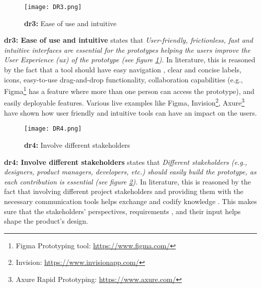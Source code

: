 \begin{figure}[htbp!]
  \centering    
  \texttt{[image: DR3.png]}
  \caption[Ease of use and intuitive]{\textbf{\ac{dr}3:} Ease of use and intuitive}
  \label{fig:design:dr3}
\end{figure}
\textbf{\ac{dr}3: Ease of use and intuitive} states that \textit{User-friendly, frictionless, fast and intuitive interfaces are essential for the prototypes helping the users improve the User Experience (\ac{ux}) of the prototype (see figure \ref{fig:design:dr3}).} 
In literature, this is reasoned by the fact that a tool should have easy navigation \cite{article:prototyping:hoffnagle}, clear and concise labels, icons, easy-to-use drag-and-drop functionality, collaboration capabilities (e.g., Figma\footnote{Figma Prototyping tool: \url{https://www.figma.com/}} has a feature where more than one person can access the prototype), and easily deployable \cite{article:prototyping:lowcode} features.
Various live examples like Figma, Invision\footnote{Invision: \url{https://www.invisionapp.com/}}, Axure\footnote{Axure Rapid Prototyping: \url{https://www.axure.com/}} have shown how user friendly and intuitive tools can have an impact on the users.

\begin{figure}[htbp!]
  \centering    
  \texttt{[image: DR4.png]}
  \caption[Involve different stakeholders]{\textbf{\ac{dr}4:} Involve different stakeholders}
  \label{fig:design:dr4}
\end{figure}
\textbf{\ac{dr}4: Involve different stakeholders} states that \textit{Different stakeholders (e.g., designers, product managers, developers, etc.) should easily build the prototype, as each contribution is essential (see figure \ref{fig:design:dr4}).}
In literature, this is reasoned by the fact that involving different project stakeholders and providing them with the necessary communication tools helps exchange and codify knowledge \cite{article:prototyping:weichbroth}. 
This makes sure that the stakeholders' perspectives, requirements \cite{misc:prorotypes:lauff}, and their input helps shape the product's design.

